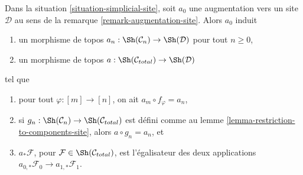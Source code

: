 \begin{lemma}
\label{lemma-augmentation-site}
Dans la situation \ref{situation-simplicial-site}, soit $a_0$ une
augmentation vers un site $\mathcal{D}$ au sens de la
remarque \ref{remark-augmentation-site}. Alors $a_0$ induit
\begin{enumerate}
\item un morphisme de topos $a_n : \Sh(\mathcal{C}_n) \to \Sh(\mathcal{D})$
pour tout $n \geq 0$,
\item un morphisme de topos $a : \Sh(\mathcal{C}_{total}) \to \Sh(\mathcal{D})$
\end{enumerate}
tel que
\begin{enumerate}
\item pour tout $\varphi : [m] \to [n]$, on ait $a_m \circ f_\varphi = a_n$,
\item si $g_n : \Sh(\mathcal{C}_n) \to \Sh(\mathcal{C}_{total})$
est défini comme au lemme \ref{lemma-restriction-to-components-site}, alors
$a \circ g_n = a_n$, et
\item $a_*\mathcal{F}$, pour $\mathcal{F} \in \Sh(\mathcal{C}_{total})$,
est l'égalisateur des deux applications
$a_{0, *}\mathcal{F}_0 \to a_{1, *}\mathcal{F}_1$.
\end{enumerate}
\end{lemma}

